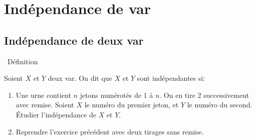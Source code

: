 \documentclass[a4paper, 11pt]{article}
\begin{document}
%





\section{Ind\'ependance de var}

\subsection{Ind\'ependance de deux var}

\noindent\ {D\'efinition}\\

 {\noindent  

\begin{defi} 
Soient $X$ et $Y$ deux var. On dit que $X$ et $Y$ sont ind\'ependantes si:\\
\vspace{1.5cm}
\end{defi}
 
}\vsec

{\footnotesize \begin{exercice} 
\begin{enumerate}
\item Une urne contient $n$ jetons num\'erot\'es de 1 \`a $n$. On en tire 2 successivement avec remise. 
Soient $X$ le num\'ero du premier jeton, et $Y$ le num\'ero du second. \'Etudier l'ind\'ependance de $X$ et $Y$.
\item Reprendre l'exercice pr\'ec\'edent avec deux tirages sans remise.
\end{enumerate}
\end{exercice}
}
\end{document}
